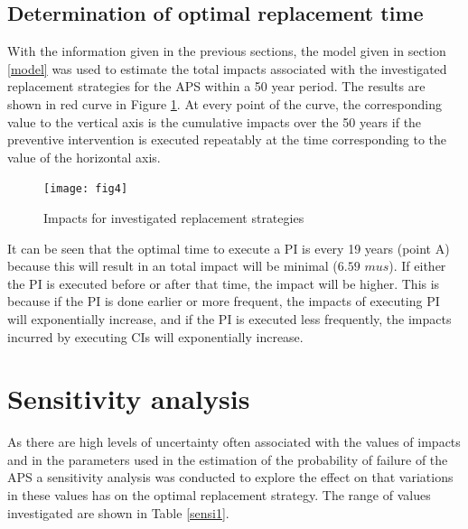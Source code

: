 \documentclass[]{article}
\begin{document}
\subsection{Determination of optimal replacement time}
With the information given in the previous sections, the model given
in section \ref{model} was used to estimate the total impacts associated with
the investigated replacement strategies for the APS within a 50 year
period. The results are shown in red curve in Figure \ref{results}.
At every point of the curve, the corresponding value to the vertical
axis is the cumulative impacts over the 50 years if the preventive
intervention is executed repeatably at the time corresponding to the
value of the horizontal axis.

\begin{figure}[H]
\centering{}\texttt{[image: fig4]}
\caption{Impacts for investigated replacement strategies}
\label{results} 
\end{figure}

It can be seen that the optimal time to execute a PI is every 19 years
(point A) because this will result in an total impact will be minimal
($6.59$ $mus$). If either the PI is executed before or after that
time, the impact will be higher. This is because if the PI is done
earlier or more frequent, the impacts of executing PI will exponentially
increase, and if the PI is executed less frequently, the impacts incurred
by executing CIs will exponentially increase. 

\section{Sensitivity analysis}
\label{sa} As there are high levels of uncertainty often associated
with the values of impacts and in the parameters used in the estimation
of the probability of failure of the APS a sensitivity analysis was
conducted to explore the effect on that variations in these values
has on the optimal replacement strategy. The range of values investigated
are shown in Table \ref{sensi1}. 
\end{document}

